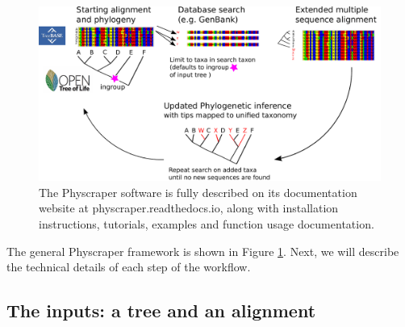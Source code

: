 \documentclass[]{article}
\begin{document}
\begin{figure}

{\centering \includegraphics[width=0.85\linewidth]{docs/figs/schematic} 

}

\caption{The Physcraper software is fully described on its documentation website at physcraper.readthedocs.io, along with installation instructions, tutorials, examples and function usage documentation.}\label{fig:framework}
\end{figure}

The general Physcraper framework is shown in Figure \ref{fig:framework}. Next, we will describe the technical details of each step of the workflow.

\hypertarget{the-inputs-a-tree-and-an-alignment}{%
\subsection{The inputs: a tree and an alignment}\label{the-inputs-a-tree-and-an-alignment}}
\end{document}

